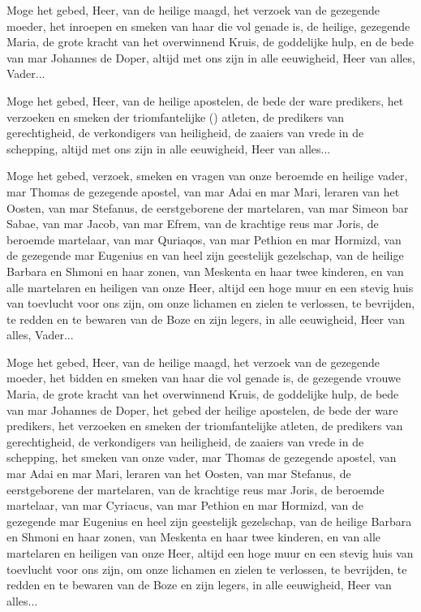 \documentclass[12pt,twoside,a5paper]{article}
\begin{document}
\begin{halfparskip}
    Moge het gebed, Heer, van de heilige maagd, het verzoek van de gezegende moeder, het inroepen en smeken van haar die vol genade is, de heilige, gezegende Maria, de grote kracht van het overwinnend Kruis, de goddelijke hulp, en de bede van mar Johannes de Doper, altijd met ons zijn in alle eeuwigheid, Heer van alles, Vader...

   Moge het gebed, Heer, van de heilige apostelen, de bede der ware predikers, het verzoeken en smeken der triomfantelijke () atleten, de predikers van gerechtigheid, de verkondigers van heiligheid, de zaaiers van vrede in de schepping, altijd met ons zijn in alle eeuwigheid, Heer van alles...

   Moge het gebed, verzoek, smeken en vragen van onze beroemde en heilige vader, mar Thomas de gezegende apostel, van mar Adai en mar Mari, leraren van het Oosten, van mar Stefanus, de eerstgeborene der martelaren, van mar Simeon bar Sabae, van mar Jacob, van mar Efrem, van de krachtige reus mar Joris, de beroemde martelaar, van mar Quriaqos, van mar Pethion en mar Hormizd, van de gezegende mar Eugenius en van heel zijn geestelijk gezelschap, van de heilige Barbara en Shmoni en haar zonen, van Meskenta en haar twee kinderen, en van alle martelaren en heiligen van onze Heer, altijd een hoge muur en een stevig huis van toevlucht voor ons zijn, om onze lichamen en zielen te verlossen, te bevrijden, te redden en te bewaren van de Boze en zijn legers, in alle eeuwigheid, Heer van alles, Vader...
\end{halfparskip}

\begin{halfparskip}
   Moge het gebed, Heer, van de heilige maagd, het verzoek van de gezegende moeder, het bidden en smeken van haar die vol genade is, de gezegende vrouwe Maria, de grote kracht van het overwinnend Kruis, de goddelijke hulp, de bede van mar Johannes de Doper, het gebed der heilige apostelen, de bede der ware predikers, het verzoeken en smeken der triomfantelijke atleten, de predikers van gerechtigheid, de verkondigers van heiligheid, de zaaiers van vrede in de schepping, het smeken van onze vader, mar Thomas de gezegende apostel, van mar Adai en mar Mari, leraren van het Oosten, van mar Stefanus, de eerstgeborene der martelaren, van de krachtige reus mar Joris, de beroemde martelaar, van mar Cyriacus, van mar Pethion en mar Hormizd, van de gezegende mar Eugenius en heel zijn geestelijk gezelschap, van de heilige Barbara en Shmoni en haar zonen, van Meskenta en haar twee kinderen, en van alle martelaren en heiligen van onze Heer, altijd een hoge muur en een stevig huis van toevlucht voor ons zijn, om onze lichamen en zielen te verlossen, te bevrijden, te redden en te bewaren van de Boze en zijn legers, in alle eeuwigheid, Heer van alles...
\end{halfparskip}
\end{document}
